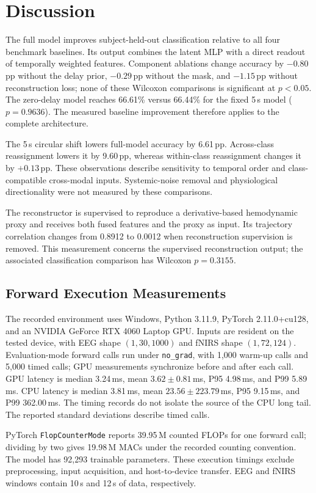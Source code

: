 \documentclass[final,5p,times,twocolumn]{elsarticle}
\begin{document}
\section{Discussion}
The full model improves subject-held-out classification relative to all four benchmark baselines. Its output combines the latent MLP with a direct readout of temporally weighted features. Component ablations change accuracy by $-0.80$\,pp without the delay prior, $-0.29$\,pp without the mask, and $-1.15$\,pp without reconstruction loss; none of these Wilcoxon comparisons is significant at $p<0.05$. The zero-delay model reaches 66.61\% versus 66.44\% for the fixed 5\,s model ($p=0.9636$). The measured baseline improvement therefore applies to the complete architecture.

The 5\,s circular shift lowers full-model accuracy by 6.61\,pp. Across-class reassignment lowers it by 9.60\,pp, whereas within-class reassignment changes it by $+0.13$\,pp. These observations describe sensitivity to temporal order and class-compatible cross-modal inputs. Systemic-noise removal and physiological directionality were not measured by these comparisons.

The reconstructor is supervised to reproduce a derivative-based hemodynamic proxy and receives both fused features and the proxy as input. Its trajectory correlation changes from 0.8912 to 0.0012 when reconstruction supervision is removed. This measurement concerns the supervised reconstruction output; the associated classification comparison has Wilcoxon $p=0.3155$.

\subsection{Forward Execution Measurements}
The recorded environment uses Windows, Python 3.11.9, PyTorch 2.11.0+cu128, and an NVIDIA GeForce RTX 4060 Laptop GPU. Inputs are resident on the tested device, with EEG shape $(1,30,1000)$ and fNIRS shape $(1,72,124)$. Evaluation-mode forward calls run under \texttt{no\_grad}, with 1,000 warm-up calls and 5,000 timed calls; GPU measurements synchronize before and after each call. GPU latency is median 3.24\,ms, mean $3.62\pm0.81$\,ms, P95 4.98\,ms, and P99 5.89\,ms. CPU latency is median 3.81\,ms, mean $23.56\pm223.79$\,ms, P95 9.15\,ms, and P99 362.00\,ms. The timing records do not isolate the source of the CPU long tail. The reported standard deviations describe timed calls.

PyTorch \texttt{FlopCounterMode} reports 39.95\,M counted FLOPs for one forward call; dividing by two gives 19.98\,M MACs under the recorded counting convention. The model has 92,293 trainable parameters. These execution timings exclude preprocessing, input acquisition, and host-to-device transfer. EEG and fNIRS windows contain 10\,s and 12\,s of data, respectively.
\end{document}
